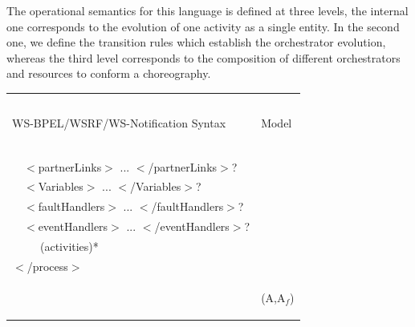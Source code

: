 The operational semantics for this language is defined at three levels, the internal one corresponds to the evolution of one activity as a single entity. In the second one, we define
the transition rules which establish the orchestrator evolution, whereas the third level corresponds to the composition
of different orchestrators and resources to conform a choreography.
\newpage
{\renewcommand{\arraystretch}{0.85}
\begin{table}[!h]
{
\tiny

\begin{center}
\begin{tabular}{|p{9cm}|p{5cm}|}
\hline
\cellcolor[gray]{.9}~ & \cellcolor[gray]{.9}~ \\
\cellcolor[gray]{.9}\hspace*{3.3cm}WS-BPEL/WSRF/WS-Notification Syntax & \cellcolor[gray]{.9}\hspace*{1.7cm}Model\\
\cellcolor[gray]{.9}~ & \cellcolor[gray]{.9}~ \\
\hline

\begin{flushleft}
\vspace{-0.2cm}
$<$process ...$>$\\
~~$<$partnerLinks$>$ ... $<$/partnerLinks$>$?\\
~~$<$Variables$>$ ... $<$/Variables$>$?\\
~~$<$faultHandlers$>$ ... $<$/faultHandlers$>$?\\
~~$<$eventHandlers$>$ ... $<$/eventHandlers$>$?\\
~~~~~(activities)*\\
$<$/process$>$\\
\end{flushleft}
&
\begin{center}
\vspace{0.4cm}
(A,A$_f$)
\end{center}\\
\hline


\end{tabular}
\end{center}}
\end{table}}

